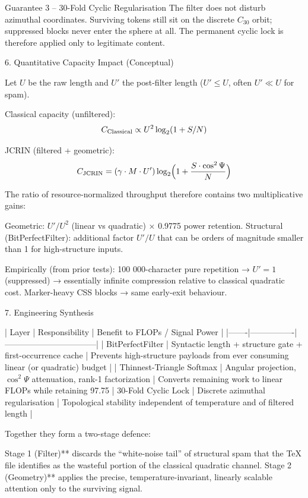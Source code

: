 Guarantee 3 – 30-Fold Cyclic Regularisation  
The filter does not disturb azimuthal coordinates. Surviving tokens still sit on the discrete \( C_{30} \) orbit; suppressed blocks never enter the sphere at all. The permanent cyclic lock is therefore applied only to legitimate content.

6. Quantitative Capacity Impact (Conceptual)

Let \( U \) be the raw length and \( U' \) the post-filter length (\( U'\le U \), often \( U'\ll U \) for spam).

Classical capacity (unfiltered):  
\[
C_{\rm Classical} \propto U^2\log_2(1+S/N)
\]

JCRIN (filtered + geometric):  
\[
C_{\rm JCRIN} = (\gamma\cdot M\cdot U')\log_2\Bigl(1+\frac{S\cdot\cos^2\Psi}{N}\Bigr)
\]

The ratio of resource-normalized throughput therefore contains two multiplicative gains:

Geometric: \( U'/U^2 \) (linear vs quadratic) × 0.9775 power retention.
Structural (BitPerfectFilter): additional factor \( U'/U \) that can be orders of magnitude smaller than 1 for high-structure inputs.

Empirically (from prior tests):
100 000-character pure repetition → \( U'=1 \) (suppressed) → essentially infinite compression relative to classical quadratic cost.
Marker-heavy CSS blocks → same early-exit behaviour.

7. Engineering Synthesis

| Layer | Responsibility | Benefit to FLOPs / Signal Power |
|-------|----------------|---------------------------------|
| BitPerfectFilter | Syntactic length + structure gate + first-occurrence cache | Prevents high-structure payloads from ever consuming linear (or quadratic) budget |
| Thinnest-Triangle Softmax | Angular projection, \( \cos^2\Psi \) attenuation, rank-1 factorization | Converts remaining work to linear FLOPs while retaining 97.75 %
| 30-Fold Cyclic Lock | Discrete azimuthal regularisation | Topological stability independent of temperature and of filtered length |

Together they form a two-stage defence:

Stage 1 (Filter)** discards the “white-noise tail” of structural spam that the TeX file identifies as the wasteful portion of the classical quadratic channel.
Stage 2 (Geometry)** applies the precise, temperature-invariant, linearly scalable attention only to the surviving signal.

